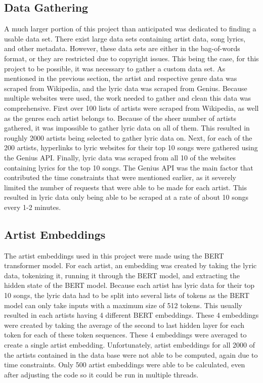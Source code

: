 \documentclass[11pt,a4paper]{article}
\begin{document}
\subsection{Data Gathering}
A much larger portion of this project than anticipated was dedicated to finding a usable data set. There exist large data sets containing artist data, song lyrics, and other metadata. However, these data sets are either in the bag-of-words format, or they are restricted due to copyright issues. This being the case, for this project to be possible, it was necessary to gather a custom data set. As mentioned in the previous section, the artist and respective genre data was scraped from Wikipedia, and the lyric data was scraped from Genius. Because multiple websites were used, the work needed to gather and clean this data was comprehensive. First over 100 lists of artists were scraped from Wikipedia, as well as the genres each artist belongs to. Because of the sheer number of artists gathered, it was impossible to gather lyric data on all of them. This resulted in roughly 2000 artists being selected to gather lyric data on. Next, for each of the 200 artists, hyperlinks to lyric websites for their top 10 songs were gathered using the Genius API. Finally, lyric data was scraped from all 10 of the websites containing lyrics for the top 10 songs. The Genius API was the main factor that contributed the time constraints that were mentioned earlier, as it severely limited the number of requests that were able to be made for each artist. This resulted in lyric data only being able to be scraped at a rate of about 10 songs every 1-2 minutes.

\subsection{Artist Embeddings}
The artist embeddings used in this project were made using the BERT transformer model. For each artist, an embedding was created by taking the lyric data, tokenizing it, running it through the BERT model, and extracting the hidden state of the BERT model. Because each artist has lyric data for their top 10 songs, the lyric data had to be split into several lists of tokens as the BERT model can only take inputs with a maximum size of 512 tokens. This usually resulted in each artists having 4 different BERT embeddings. These 4 embeddings were created by taking the average of the second to last hidden layer for each token for each of these token sequences. These 4 embeddings were averaged to create a single artist embedding. Unfortunately, artist embeddings for all 2000 of the artists contained in the data base were not able to be computed, again due to time constraints. Only 500 artist embeddings were able to be calculated, even after adjusting the code so it could be run in multiple threads.
\end{document}
